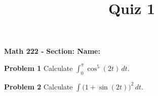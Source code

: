 \documentclass{article}
\title{Quiz 1}
\begin{document}
\begin{center}\makeatletter %
{ \bf Math 222 - \@title }
{ \bf \hfill Section: \underline{\hspace{2cm}} \hfill Name: \underline{\hspace{5cm}} }
\end{center}

{\bf Problem 1} Calculate $\displaystyle \int_0^{\pi} \cos^5(2t)\,dt$.

\vfill

{\bf Problem 2} Calculate $\displaystyle \int \Big(1+ \sin(2t)\Big)^2\,dt$.

\vfill
\end{document}
